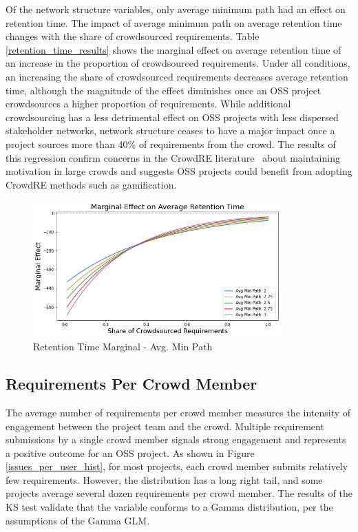 Of the network structure variables, only average minimum path had an effect on retention time. The impact of average minimum path on average retention time changes with the share of crowdsourced requirements. Table \ref{retention_time_results} shows the marginal effect on average retention time of an increase in the proportion of crowdsourced requirements. Under all conditions, an increasing the share of crowdsourced requirements decreases average retention time, although the magnitude of the effect diminishes once an OSS project crowdsources a higher proportion of requirements. While additional crowdsourcing has a less detrimental effect on OSS projects with less dispersed stakeholder networks, network structure ceases to have a major impact once a project sources more than 40\% of requirements from the crowd. The results of this regression confirm concerns in the CrowdRE literature~\cite{glinz, groen, levy} about maintaining motivation in large crowds and suggests OSS projects could benefit from adopting CrowdRE methods such as gamification. 

\begin{figure}
  \includegraphics[width=0.85\textwidth]{img2/retention_time_marginal.png}
\caption{Retention Time Marginal - Avg. Min Path}
\label{retention_time_marginal_avg_min_path}
\end{figure}

\subsection{Requirements Per Crowd Member}

The average number of requirements per crowd member measures the intensity of engagement between the project team and the crowd. Multiple requirement submissions by a single crowd member signals strong engagement and represents a positive outcome for an OSS project. As shown in Figure \ref{issues_per_user_hist}, for most projects, each crowd member submits relatively few requirements. However, the distribution has a long right tail, and some projects average several dozen requirements per crowd member. The results of the KS test validate that the variable conforms to a Gamma distribution, per the assumptions of the Gamma GLM.

